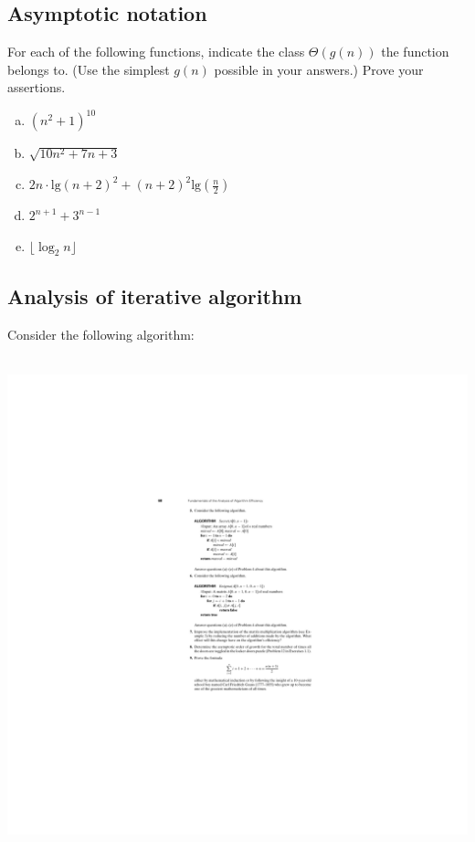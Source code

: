 \documentclass[12pt]{article}
\begin{document}
\vspace{2in}

\clearpage
\subsection{Asymptotic notation}
For each of the following functions, indicate the class $\Theta(g(n))$ the function belongs to. (Use the simplest $g(n)$ possible in your answers.) Prove your assertions.

\begin{enumerate}[a.]
    \item $(n^2 + 1)^{10}$
    \item $\sqrt{10n^2 + 7n + 3}$
    \item $2n\cdot\textrm{lg}(n + 2)^2 + (n+2)^2 \textrm{lg}(\frac{n}{2})$
    \item $2^{n+1} + 3^{n-1}$
    \item $\lfloor\log_2 n\rfloor$
\end{enumerate}


\clearpage
\subsection{Analysis of iterative algorithm}

Consider the following algorithm:\\~

\includegraphics{w02-alg.pdf}
\end{document}
